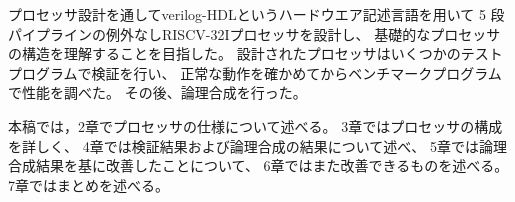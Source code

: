 \documentclass[../main.tex]{subfiles}
\begin{document}
    プロセッサ設計を通してverilog-HDLというハードウエア記述言語を用いて
    5 段パイプラインの例外なしRISCV-32Iプロセッサを設計し、
    基礎的なプロセッサの構造を理解することを目指した。
    設計されたプロセッサはいくつかのテストプログラムで検証を行い、
    正常な動作を確かめてからベンチマークプログラムで性能を調べた。
    その後、論理合成を行った。

    本稿では，2章でプロセッサの仕様について述べる。
    3章ではプロセッサの構成を詳しく、
    4章では検証結果および論理合成の結果について述べ、
    5章では論理合成結果を基に改善したことについて、
    6章ではまた改善できるものを述べる。
    7章ではまとめを述べる。
\end{document}
